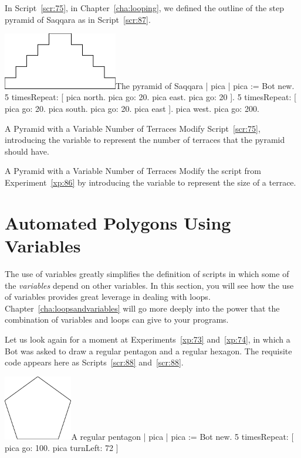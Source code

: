 \documentclass[a4paper,10pt,twoside]{book}
\begin{document}
In Script~\ref{scr:75}, in Chapter~\ref{cha:looping}, we defined the outline of the step pyramid of Saqqara as in Script~\ref{scr:87}. 

\begin{scriptfigwithsize}[0.4]{\includegraphics[width=5cm]{varPyramid}}{The pyramid of Saqqara}\label{scr:87}
| pica | 
pica := Bot new. 
5 timesRepeat: 
[ pica north. 
pica go: 20. 
pica east. 
pica go: 20 ]. 
5 timesRepeat: 
[ pica go: 20. 
pica south. 
pica go: 20. 
pica east ]. 
pica west. 
pica go: 200.	
\end{scriptfigwithsize}


\begin{exonofigtitle}{A Pyramid with a Variable Number of Terraces}\label{xp:86}
Modify Script~\ref{scr:75}, introducing the variable  to represent the number of terraces that the pyramid should have. 
\end{exonofigtitle}


\begin{exonofigtitle}{A Pyramid with a Variable Number of Terraces}
Modify the script from Experiment~\ref{xp:86} by introducing the variable  to represent the size of a terrace. 
\end{exonofigtitle}


\section{Automated Polygons Using Variables}

The use of variables greatly simplifies the definition of scripts in which some of the \emph{variables} 
depend on other variables. In this section, you will see how the use of variables provides great 
leverage in dealing with loops. Chapter~\ref{cha:loopsandvariables} will go more deeply into the power that the combination of variables and loops can give to your programs.

Let us look again for a moment at Experiments~\ref{xp:73} and~\ref{xp:74}, in which a Bot was asked to 
draw a regular pentagon and a regular hexagon. The requisite code appears here as Scripts~\ref{scr:88}
and~\ref{scr:88}.

\begin{scriptfigwithsize}[0.4]{\includegraphics[width=3cm]{varFPentagon}}{A regular pentagon}\label{scr:88}
| pica | 
pica := Bot new. 
5 timesRepeat: 
	[ pica go: 100. 
	pica turnLeft: 72 ] 
\end{scriptfigwithsize}
\end{document}
